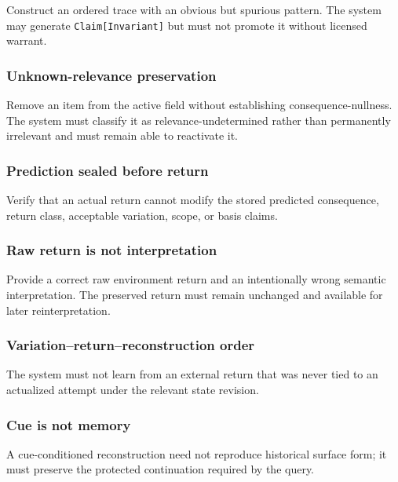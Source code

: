 \documentclass[
]{article}
\begin{document}
Construct an ordered trace with an obvious but spurious pattern. The system may
generate \texttt{Claim[Invariant]} but must not promote it without licensed
warrant.

\subsubsection{Unknown-relevance preservation}\label{unknown-relevance-preservation-test}

Remove an item from the active field without establishing consequence-nullness.
The system must classify it as relevance-undetermined rather than permanently
irrelevant and must remain able to reactivate it.



\subsubsection{Prediction sealed before return}\label{prediction-sealed-before-return-test}

Verify that an actual return cannot modify the stored predicted consequence,
return class, acceptable variation, scope, or basis claims.

\subsubsection{Raw return is not interpretation}\label{raw-return-is-not-interpretation-test}

Provide a correct raw environment return and an intentionally wrong semantic
interpretation. The preserved return must remain unchanged and available for
later reinterpretation.

\subsubsection{Variation--return--reconstruction order}\label{variation-return-reconstruction-order-test}

The system must not learn from an external return that was never tied to an
actualized attempt under the relevant state revision.

\subsubsection{Cue is not memory}\label{cue-is-not-memory-test}

A cue-conditioned reconstruction need not reproduce historical surface form;
it must preserve the protected continuation required by the query.
\end{document}
